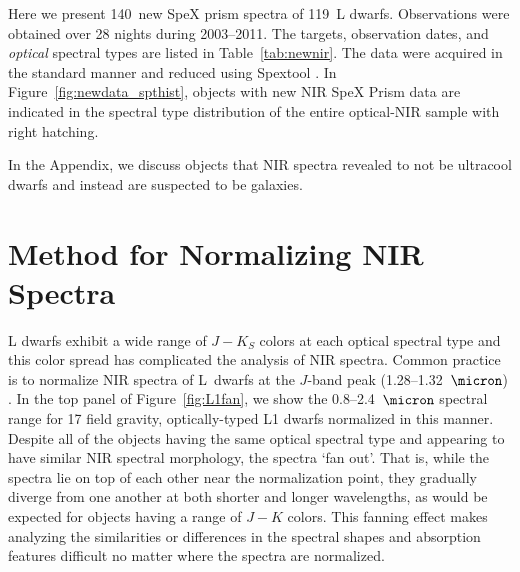 \documentclass[12pt,preprint]{aastex}
\newcommand{\prismspectra}{140} %
\newcommand{\objects}{119} %
\begin{document}
Here we present \prismspectra~new SpeX prism spectra of \objects~L dwarfs. 
Observations were obtained over 28 nights during 2003--2011. The targets, observation dates, and \emph{optical} spectral types are listed in Table~\ref{tab:newnir}. 
The data were acquired in the standard manner and reduced using Spextool \citep{Cushing04,Spextool2}.
In Figure~\ref{fig:newdata_spthist}, objects with new NIR SpeX Prism data are indicated in the spectral type distribution of the entire optical-NIR sample with right hatching.

In the Appendix, we discuss objects that NIR spectra revealed to not be ultracool dwarfs and instead are suspected to be galaxies.


\section{Method for Normalizing NIR Spectra}
\label{sec:method}

L dwarfs exhibit a wide range of $J-K_S$ colors at each optical spectral type \cite[e.g.,][Fig. 3]{Schmidt10} and this color spread has complicated the analysis of NIR spectra. 
Common practice is to normalize NIR spectra of L~dwarfs at the $J$-band peak (1.28--1.32~$\micron$) \citep[e.g.,][]{Kirkpatrick10}. 
In the top panel of Figure~\ref{fig:L1fan}, we show the 0.8--2.4~$\micron$ spectral range for 17 field gravity, optically-typed L1 dwarfs normalized in this manner.
Despite all of the objects having the same optical spectral type and appearing to have similar NIR spectral morphology, the spectra `fan out'. 
That is, while the spectra lie on top of each other near the normalization point, they gradually diverge from one another at both shorter and longer wavelengths, as would be expected for objects having a range of $J-K$ colors. 
This fanning effect makes analyzing the similarities or differences in the spectral shapes and absorption features difficult no matter where the spectra are normalized.
\end{document}
